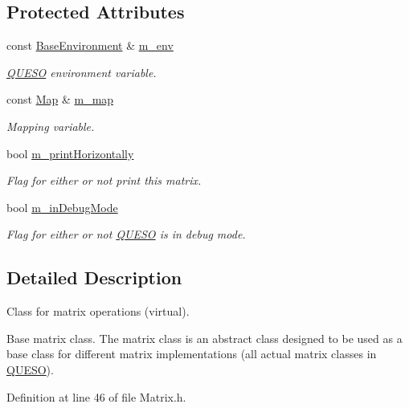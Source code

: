 \subsection*{Protected Attributes}
\begin{DoxyCompactItemize}
\item 
const \hyperlink{class_q_u_e_s_o_1_1_base_environment}{Base\-Environment} \& \hyperlink{class_q_u_e_s_o_1_1_matrix_a247fb0fc0b87fecdee054bb4660b68e8}{m\-\_\-env}
\begin{DoxyCompactList}\small\item\em \hyperlink{namespace_q_u_e_s_o}{Q\-U\-E\-S\-O} environment variable. \end{DoxyCompactList}\item 
const \hyperlink{class_q_u_e_s_o_1_1_map}{Map} \& \hyperlink{class_q_u_e_s_o_1_1_matrix_adb42d344c0b2859c3b4a4f5a3dd7875f}{m\-\_\-map}
\begin{DoxyCompactList}\small\item\em Mapping variable. \end{DoxyCompactList}\item 
bool \hyperlink{class_q_u_e_s_o_1_1_matrix_aebf5e44b149cf1454b2e12995d9f8b6b}{m\-\_\-print\-Horizontally}
\begin{DoxyCompactList}\small\item\em Flag for either or not print this matrix. \end{DoxyCompactList}\item 
bool \hyperlink{class_q_u_e_s_o_1_1_matrix_a3384d3fc1a1058fce9191b0d74653911}{m\-\_\-in\-Debug\-Mode}
\begin{DoxyCompactList}\small\item\em Flag for either or not \hyperlink{namespace_q_u_e_s_o}{Q\-U\-E\-S\-O} is in debug mode. \end{DoxyCompactList}\end{DoxyCompactItemize}


\subsection{Detailed Description}
Class for matrix operations (virtual). 

Base matrix class. The matrix class is an abstract class designed to be used as a base class for different matrix implementations (all actual matrix classes in \hyperlink{namespace_q_u_e_s_o}{Q\-U\-E\-S\-O}). 

Definition at line 46 of file Matrix.\-h.



